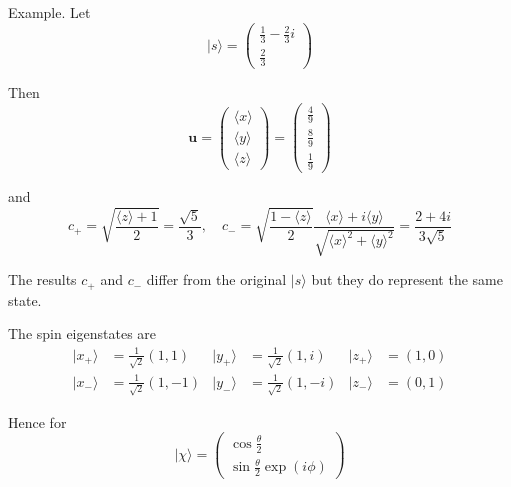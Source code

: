 Example. Let
\begin{equation*}
|s\rangle=\begin{pmatrix}\frac{1}{3}-\frac{2}{3}i\\[1ex]\frac{2}{3}\end{pmatrix}
\end{equation*}

Then
\begin{equation*}
\mathbf u
=\begin{pmatrix}\langle x\rangle\\[1ex]\langle y\rangle\\[1ex]\langle z\rangle\end{pmatrix}
=\begin{pmatrix}\frac{4}{9}\\[1ex]\frac{8}{9}\\[1ex]\frac{1}{9}\end{pmatrix}
\end{equation*}

and
\begin{equation*}
c_+=\sqrt{\frac{\langle z\rangle+1}{2}}=\frac{\sqrt5}{3},\quad
c_-=\sqrt{\frac{1-\langle z\rangle}{2}}
\frac{\langle x\rangle+i\langle y\rangle}{\sqrt{\langle x\rangle^2+\langle y\rangle^2}}
=\frac{2+4i}{3\sqrt5}
\end{equation*}

The results $c_+$ and $c_-$ differ from the original $|s\rangle$ but they do represent the same state.

\bigskip
The spin eigenstates are
\begin{align*}
|x_+\rangle&=\tfrac{1}{\sqrt2}(1,1) &
|y_+\rangle&=\tfrac{1}{\sqrt2}(1,i) &
|z_+\rangle&=(1,0)
\\
|x_-\rangle&=\tfrac{1}{\sqrt2}(1,-1) &
|y_-\rangle&=\tfrac{1}{\sqrt2}(1,-i) &
|z_-\rangle&=(0,1)
\end{align*}

Hence for
\begin{equation*}
|\chi\rangle=\begin{pmatrix}\cos\frac{\theta}{2}\\[1ex]\sin\frac{\theta}{2}\exp(i\phi)\end{pmatrix}
\end{equation*}

